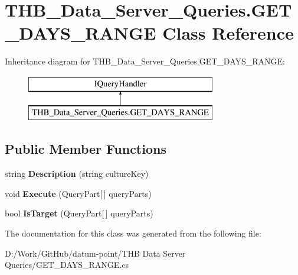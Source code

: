 \hypertarget{class_t_h_b___data___server___queries_1_1_g_e_t___d_a_y_s___r_a_n_g_e}{}\section{T\+H\+B\+\_\+\+Data\+\_\+\+Server\+\_\+\+Queries.\+G\+E\+T\+\_\+\+D\+A\+Y\+S\+\_\+\+R\+A\+N\+GE Class Reference}
\label{class_t_h_b___data___server___queries_1_1_g_e_t___d_a_y_s___r_a_n_g_e}
Inheritance diagram for T\+H\+B\+\_\+\+Data\+\_\+\+Server\+\_\+\+Queries.\+G\+E\+T\+\_\+\+D\+A\+Y\+S\+\_\+\+R\+A\+N\+GE\+:\begin{figure}[H]
\begin{center}
\leavevmode
\includegraphics[height=2.000000cm]{de/de2/class_t_h_b___data___server___queries_1_1_g_e_t___d_a_y_s___r_a_n_g_e}
\end{center}
\end{figure}
\subsection*{Public Member Functions}
\begin{DoxyCompactItemize}
\item 
\mbox{\label{class_t_h_b___data___server___queries_1_1_g_e_t___d_a_y_s___r_a_n_g_e_aa91ce7c90a325c70aab9aaf112fe49f3}} 
string {\bfseries Description} (string culture\+Key)
\item 
\mbox{\label{class_t_h_b___data___server___queries_1_1_g_e_t___d_a_y_s___r_a_n_g_e_a6c1884577a045fad484de904dc0da636}} 
void {\bfseries Execute} (Query\+Part\mbox{[}$\,$\mbox{]} query\+Parts)
\item 
\mbox{\label{class_t_h_b___data___server___queries_1_1_g_e_t___d_a_y_s___r_a_n_g_e_a1f27cee6dbc3ba3fdfad0590a75d239b}} 
bool {\bfseries Is\+Target} (Query\+Part\mbox{[}$\,$\mbox{]} query\+Parts)
\end{DoxyCompactItemize}


The documentation for this class was generated from the following file\+:\begin{DoxyCompactItemize}
\item 
D\+:/\+Work/\+Git\+Hub/datum-\/point/\+T\+H\+B Data Server Queries/G\+E\+T\+\_\+\+D\+A\+Y\+S\+\_\+\+R\+A\+N\+G\+E.\+cs\end{DoxyCompactItemize}
